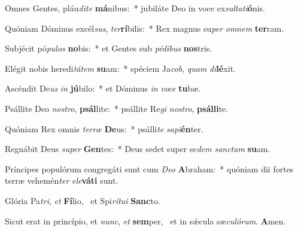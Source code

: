\item Omnes Gentes, pláu\textit{di}\textit{te} \textbf{má}nibus:~* jubiláte Deo in voce ex\textit{sul}\textit{ta}\textit{ti}\textbf{ó}nis.
\item Quóniam Dóminus excél\textit{sus}, \textit{ter}\textbf{rí}bilis:~* Rex magnus su\textit{per} \textit{om}\textit{nem} \textbf{ter}ram.
\item Subjécit pó\textit{pu}\textit{los} \textbf{no}bis:~* et Gentes sub \textit{pé}\textit{di}\textit{bus} \textbf{nos}tris.
\item Elégit nobis heredi\textit{tá}\textit{tem} \textbf{su}am:~* spéciem Ja\textit{cob}, \textit{quam} \textit{di}\textbf{lé}xit.
\item Ascéndit De\textit{us} \textit{in} \textbf{jú}bilo:~* et Dóminus \textit{in} \textit{vo}\textit{ce} \textbf{tu}bæ.
\item Psállite Deo \textit{nos}\textit{tro}, \textbf{psál}lite:~* psállite Re\textit{gi} \textit{nos}\textit{tro}, \textbf{psál}\textbf{li}te.
\item Quóniam Rex omnis \textit{ter}\textit{ræ} \textbf{De}us:~* psálli\textit{te} \textit{sa}\textit{pi}\textbf{én}ter.
\item Regnábit Deus \textit{su}\textit{per} \textbf{Gen}tes:~* Deus sedet super se\textit{dem} \textit{sanc}\textit{tam} \textbf{su}am.
\item Príncipes populórum congregáti sunt cum \textit{De}\textit{o} \textbf{A}braham:~* quóniam dii fortes terræ vehemén\textit{ter} \textit{e}\textit{le}\textbf{vá}\textbf{ti} sunt.
\item Glória Pa\textit{tri}, \textit{et} \textbf{Fí}lio,~\psstar{} et Spi\textit{rí}\textit{tu}\textit{i} \textbf{Sanc}to.
\item Sicut erat in princípio, et \textit{nunc}, \textit{et} \textbf{sem}per,~\psstar{} et in sǽcula sæ\textit{cu}\textit{ló}\textit{rum}. \textbf{A}men.
